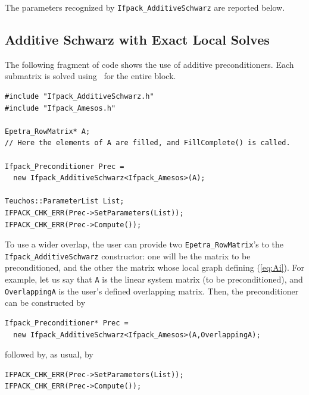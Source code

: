The parameters recognized by \verb~Ifpack_AdditiveSchwarz~ are reported below.

\smallskip



\subsection{Additive Schwarz with Exact Local Solves}
\label{sec:as_amesos}

The following fragment of code shows the use of additive preconditioners. Each
submatrix is solved using \amesos\ for the entire block.
\begin{verbatim}
#include "Ifpack_AdditiveSchwarz.h"
#include "Ifpack_Amesos.h"

Epetra_RowMatrix* A;
// Here the elements of A are filled, and FillComplete() is called.

Ifpack_Preconditioner Prec = 
  new Ifpack_AdditiveSchwarz<Ifpack_Amesos>(A);

Teuchos::ParameterList List;
IFPACK_CHK_ERR(Prec->SetParameters(List));
IFPACK_CHK_ERR(Prec->Compute());
\end{verbatim}

To use a wider overlap, the user can provide two \verb!Epetra_RowMatrix!'s to the
\verb!Ifpack_AdditiveSchwarz! constructor: one will be the matrix to be
preconditioned, and the other the matrix whose local graph defining
(\ref{eq:Ai}).
For example, let us say that \verb!A! is the linear system matrix (to be
preconditioned), and \verb!OverlappingA! is the user's defined overlapping
matrix. Then, the preconditioner can be constructed by
\begin{verbatim}
Ifpack_Preconditioner* Prec = 
  new Ifpack_AdditiveSchwarz<Ifpack_Amesos>(A,OverlappingA);
\end{verbatim}
\hspace*{1cm}
followed by, as usual, by
\begin{verbatim}
IFPACK_CHK_ERR(Prec->SetParameters(List));
IFPACK_CHK_ERR(Prec->Compute());
\end{verbatim}

